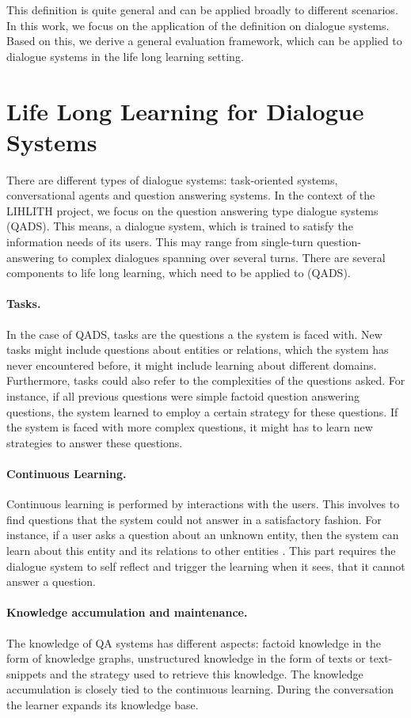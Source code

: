 \documentclass{lihlith}
\theoremstyle{definition}
\theoremstyle{remark}
\begin{document}
This definition is quite general and can be applied broadly to different scenarios. In this work, we focus on the application of the definition on dialogue systems. Based on this, we derive a general evaluation framework, which can be applied to dialogue systems in the life long learning setting. 


\section{Life Long Learning for Dialogue Systems}
\label{sec:lll4ds}
There are different types of dialogue systems: task-oriented systems, conversational agents and question answering systems. In the context of the LIHLITH project, we focus on the question answering type dialogue systems (QADS). This means, a dialogue system, which is trained to satisfy the information needs of its users. This may range from single-turn question-answering to complex dialogues spanning over several turns. 
There are several components to life long learning, which need to be applied to (QADS). 
\paragraph{Tasks.} In the case of QADS, tasks are the questions a the system is faced with. New tasks might include questions about entities or relations, which the system has never encountered before, it might include learning about different domains. Furthermore, tasks could also refer to the complexities of the questions asked. For instance, if all previous questions were simple factoid question answering questions, the system learned to employ a certain strategy for these questions. If the system is faced with more complex questions, it might has to learn new strategies to answer these questions. 
\paragraph{Continuous Learning.} Continuous learning is performed by interactions with the users. This involves to find questions that the system could not answer in a satisfactory fashion. For instance, if a user asks a question about an unknown entity, then the system can learn about this entity and its relations to other entities \cite{mazumder2018towards}. This part requires the dialogue system to self reflect and trigger the learning when it sees, that it cannot answer a question.
\paragraph{Knowledge accumulation and maintenance.} The knowledge of QA systems has different aspects: factoid knowledge in the form of knowledge graphs, unstructured knowledge in the form of texts or text-snippets and the strategy used to retrieve this knowledge. The knowledge accumulation is closely tied to the continuous learning. During the conversation the learner expands its knowledge base.
\end{document}
